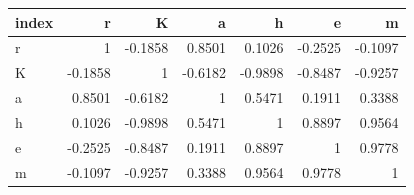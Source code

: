 \begin{tabular}{lrrrrrr}
\toprule
index & r & K & a & h & e & m \\
\midrule
r & 1 & -0.1858 & 0.8501 & 0.1026 & -0.2525 & -0.1097 \\
K & -0.1858 & 1 & -0.6182 & -0.9898 & -0.8487 & -0.9257 \\
a & 0.8501 & -0.6182 & 1 & 0.5471 & 0.1911 & 0.3388 \\
h & 0.1026 & -0.9898 & 0.5471 & 1 & 0.8897 & 0.9564 \\
e & -0.2525 & -0.8487 & 0.1911 & 0.8897 & 1 & 0.9778 \\
m & -0.1097 & -0.9257 & 0.3388 & 0.9564 & 0.9778 & 1 \\
\bottomrule
\end{tabular}
